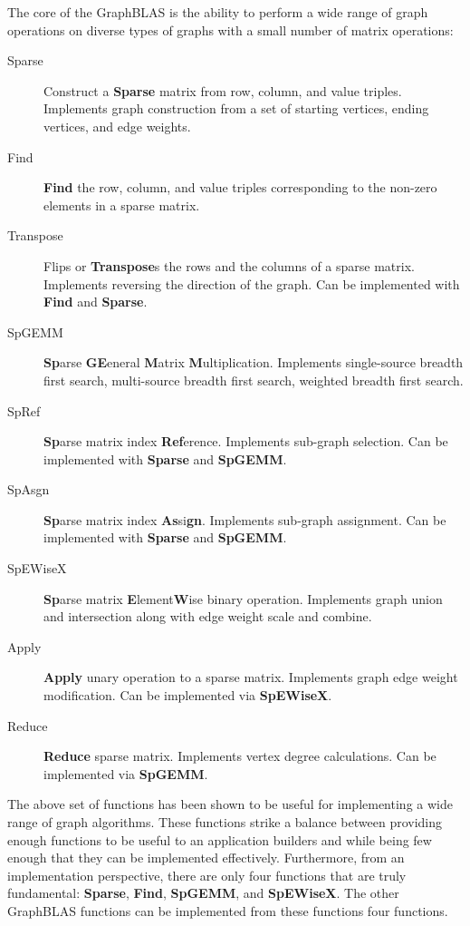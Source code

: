 The core of the GraphBLAS is the ability to perform a wide range of graph operations on diverse types of graphs with a small number of matrix operations:
\begin{description}
\item[Sparse] Construct a {\bf Sparse} matrix from row, column, and value triples.  Implements graph construction from a set of starting vertices, ending vertices, and edge weights.
\item[Find] {\bf Find} the row, column, and value triples corresponding to the non-zero elements in a sparse matrix.
\item[Transpose] Flips or {\bf Transpose}s the rows and the columns of a sparse matrix.  Implements reversing the direction of the graph.  Can be implemented with  {\bf Find} and {\bf Sparse}.
\item[SpGEMM] {\bf Sp}arse {\bf GE}eneral {\bf M}atrix {\bf M}ultiplication.   Implements single-source breadth first search, multi-source breadth first search, weighted breadth first search.
\item[SpRef] {\bf Sp}arse matrix index {\bf Ref}erence. Implements sub-graph selection.  Can be implemented with {\bf Sparse} and {\bf SpGEMM}.
\item[SpAsgn] {\bf Sp}arse matrix index {\bf As}si{\bf gn}.  Implements sub-graph assignment.  Can be implemented with {\bf Sparse} and {\bf SpGEMM}.
\item[SpEWiseX] {\bf Sp}arse matrix {\bf E}lement{\bf W}ise binary operation. Implements graph union and intersection along with edge weight scale and combine.
\item[Apply] {\bf Apply} unary operation to a sparse matrix.  Implements graph edge weight modification.  Can be implemented via {\bf SpEWiseX}.
\item[Reduce] {\bf Reduce} sparse matrix.  Implements vertex degree calculations.  Can be implemented via {\bf SpGEMM}.
\end{description}
The above set of functions has been shown to be useful for implementing a wide range of graph algorithms.  These functions strike a balance between providing enough functions to be useful to an application builders and while being few enough that they can be implemented effectively.  Furthermore, from an implementation perspective, there are only four functions that are truly fundamental: {\bf Sparse}, {\bf Find}, {\bf SpGEMM}, and {\bf SpEWiseX}.  The other GraphBLAS functions can be implemented from these functions four functions.


